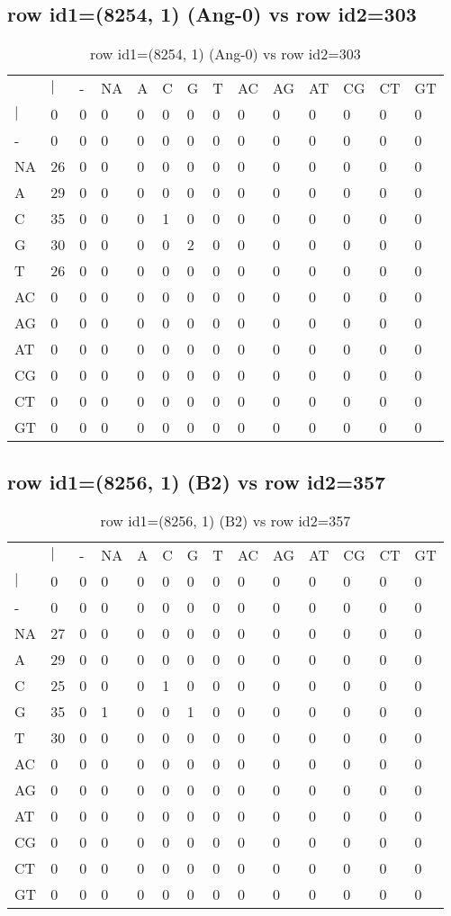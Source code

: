 \subsection{row id1=(8254, 1) (Ang-0) vs row id2=303}
\begin{center}
\begin{longtable}{|l|l|l|l|l|l|l|l|l|l|l|l|l|l|}
\caption{row id1=(8254, 1) (Ang-0) vs row id2=303} \label{table_dm202}\\
\hline
\\
\hline
&$|$&-&NA&A&C&G&T&AC&AG&AT&CG&CT&GT\\
$|$&0&0&0&0&0&0&0&0&0&0&0&0&0\\
-&0&0&0&0&0&0&0&0&0&0&0&0&0\\
NA&26&0&0&0&0&0&0&0&0&0&0&0&0\\
A&29&0&0&0&0&0&0&0&0&0&0&0&0\\
C&35&0&0&0&1&0&0&0&0&0&0&0&0\\
G&30&0&0&0&0&2&0&0&0&0&0&0&0\\
T&26&0&0&0&0&0&0&0&0&0&0&0&0\\
AC&0&0&0&0&0&0&0&0&0&0&0&0&0\\
AG&0&0&0&0&0&0&0&0&0&0&0&0&0\\
AT&0&0&0&0&0&0&0&0&0&0&0&0&0\\
CG&0&0&0&0&0&0&0&0&0&0&0&0&0\\
CT&0&0&0&0&0&0&0&0&0&0&0&0&0\\
GT&0&0&0&0&0&0&0&0&0&0&0&0&0\\
\hline
\end{longtable}
\end{center}

\subsection{row id1=(8256, 1) (B2) vs row id2=357}
\begin{center}
\begin{longtable}{|l|l|l|l|l|l|l|l|l|l|l|l|l|l|}
\caption{row id1=(8256, 1) (B2) vs row id2=357} \label{table_dm204}\\
\hline
\\
\hline
&$|$&-&NA&A&C&G&T&AC&AG&AT&CG&CT&GT\\
$|$&0&0&0&0&0&0&0&0&0&0&0&0&0\\
-&0&0&0&0&0&0&0&0&0&0&0&0&0\\
NA&27&0&0&0&0&0&0&0&0&0&0&0&0\\
A&29&0&0&0&0&0&0&0&0&0&0&0&0\\
C&25&0&0&0&1&0&0&0&0&0&0&0&0\\
G&35&0&1&0&0&1&0&0&0&0&0&0&0\\
T&30&0&0&0&0&0&0&0&0&0&0&0&0\\
AC&0&0&0&0&0&0&0&0&0&0&0&0&0\\
AG&0&0&0&0&0&0&0&0&0&0&0&0&0\\
AT&0&0&0&0&0&0&0&0&0&0&0&0&0\\
CG&0&0&0&0&0&0&0&0&0&0&0&0&0\\
CT&0&0&0&0&0&0&0&0&0&0&0&0&0\\
GT&0&0&0&0&0&0&0&0&0&0&0&0&0\\
\hline
\end{longtable}
\end{center}

